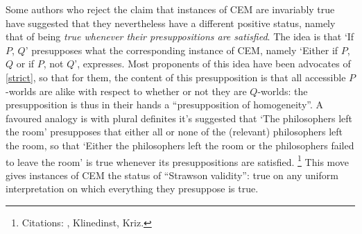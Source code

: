 \documentclass[If.tex]{subfiles}
\begin{document}
Some authors who reject the claim that instances of CEM are invariably true have suggested that they nevertheless have a different positive status, namely that of being \emph{true whenever their presuppositions are satisfied}.  The idea is that ‘If $P$, $Q$’ presupposes what the corresponding instance of CEM, namely ‘Either if $P$, $Q$ or if $P$, not $Q$’, expresses.  Most proponents of this idea have been advocates of \ref{strict}, so that for them, the content of this presupposition is that all accessible $P$-worlds are alike with respect to whether or not they are $Q$-worlds: the presupposition is thus in their hands a “presupposition of homogeneity”. A favoured analogy is with plural definites it's suggested that ‘The philosophers left the room’ presupposes that either all or none of the (relevant) philosophers left the room, so that ‘Either the philosophers left the room or the philosophers failed to leave the room’ is true whenever its presuppositions are satisfied.%
\footnote{Citations: \cite{vonFintelNLSECD,vonFintelCDC}, Klinedinst, Kriz.}%
This move gives instances of CEM the status of “Strawson validity”: true on any uniform interpretation on which everything they presuppose is true.
\end{document}
